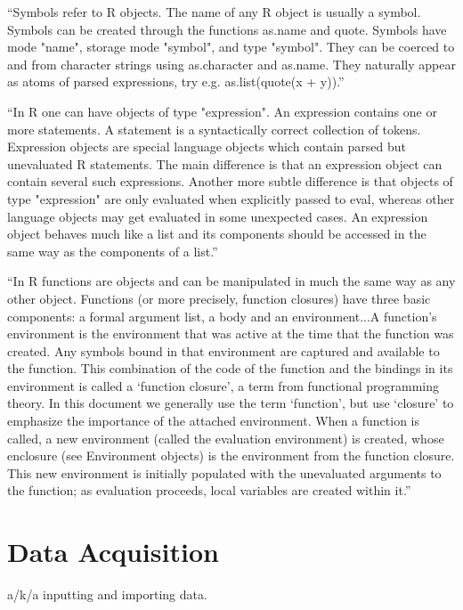 ``Symbols refer to R objects. The name of any R object is usually a symbol. Symbols can be created through the functions as.name and quote.
Symbols have mode "name", storage mode "symbol", and type "symbol". They can be coerced to and from character strings using as.character and as.name. They naturally appear as atoms of parsed expressions, try e.g. as.list(quote(x + y)).''

``In R one can have objects of type "expression". An expression contains one or more statements. A statement is a syntactically correct collection of tokens. Expression objects are special language objects which contain parsed but unevaluated R statements. The main difference is that an expression object can contain several such expressions. Another more subtle difference is that objects of type "expression" are only evaluated when explicitly passed to eval, whereas other language objects may get evaluated in some unexpected cases.
An expression object behaves much like a list and its components should be accessed in the same way as the components of a list.''

 ``In R functions are objects and can be manipulated in much the same way as any other object. Functions (or more precisely, function closures) have three basic components: a formal argument list, a body and an environment...A function’s environment is the environment that was active at the time that the function was created. Any symbols bound in that environment are captured and available to the function. This combination of the code of the function and the bindings in its environment is called a ‘function closure’, a term from functional programming theory. In this document we generally use the term ‘function’, but use ‘closure’ to emphasize the importance of the attached environment.  When a function is called, a new environment (called the evaluation environment) is created, whose enclosure (see Environment objects) is the environment from the function closure. This new environment is initially populated with the unevaluated arguments to the function; as evaluation proceeds, local variables are created within it.''

\section{Data Acquisition}

a/k/a inputting and importing data.


